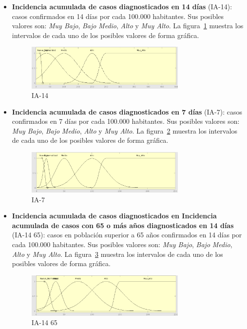 \documentclass[12pt,a4paper, xcolor=table]{article}
\begin{document}
\begin{itemize}

    \item \textbf{Incidencia acumulada de casos diagnosticados en 14 días} (IA-14): casos confirmados en 14 días por cada 100.000 habitantes. Sus posibles valores son: \textit{Muy Bajo}, \textit{Bajo} \textit{Medio}, {\textit{Alto}} y {\textit{Muy Alto}}. La figura~\ref{IA-14} muestra los intervalos de cada uno de los posibles valores de forma gráfica.

    \begin{figure}[!h]
      \centering
      \includegraphics[width=300px]{img/ia_ac_14.png}
      \caption{IA-14}
      \label{IA-14}
    \end{figure}

    \item \textbf{Incidencia acumulada de casos diagnosticados en 7 días} (IA-7): casos confirmados en 7 días por cada 100.000 habitantes. Sus posibles valores son: \textit{Muy Bajo}, \textit{Bajo} \textit{Medio}, {\textit{Alto}} y {\textit{Muy Alto}}. La figura~\ref{IA-7} muestra los intervalos de cada uno de los posibles valores de forma gráfica.

    \begin{figure}[!h]
      \centering
      \includegraphics[width=300px]{img/ia_ac_7.png}
      \caption{IA-7}
      \label{IA-7}
    \end{figure}

    \item \textbf{Incidencia acumulada de casos diagnosticados en Incidencia acumulada de casos con 65 o más años diagnosticados en 14 días} (IA-14 65): casos en población superior a 65 años confirmados en 14 días por cada 100.000 habitantes. Sus posibles valores son: \textit{Muy Bajo}, \textit{Bajo} \textit{Medio}, {\textit{Alto}} y {\textit{Muy Alto}}. La figura~\ref{IA-14 65} muestra los intervalos de cada uno de los posibles valores de forma gráfica.
    \newpage
    \begin{figure}[!h]
      \centering
      \includegraphics[width=300px]{img/ia_65_14.png}
      \caption{IA-14 65}
      \label{IA-14 65}
    \end{figure}


\end{itemize}
\end{document}
